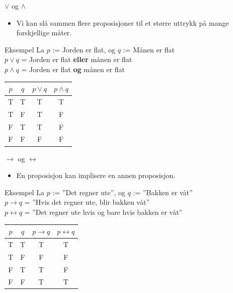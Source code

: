 \begin{frame}{$\lor$ og $\land$}
    \begin{itemize}
        \item Vi kan slå sammen flere proposisjoner til et større uttrykk på mange forskjellige måter.
    \end{itemize}
    \begin{block}{Eksempel}
        La $p$ := Jorden er flat, og $q$ := Månen er flat\\
        $p \lor q$ = Jorden er flat \textbf{eller} månen er flat\\
        $p \land q$ = Jorden er flat \textbf{og} månen er flat\\
    \end{block}
    \pause
    \begin{tabular}{c|c|c|c}
        $p$ & $q$ & $p \lor q$ & $p \land q$ \\ \hline
        T & T & T & T \\
        T & F & T & F \\
        F & T & T & F \\
        F & F & F & F \\
    \end{tabular}
\end{frame}

\begin{frame}{$\rightarrow$ og $\leftrightarrow$}
    \begin{itemize}
        \item En proposisjon kan implisere en annen proposisjon.
    \end{itemize}
    \begin{block}{Eksempel}
        La $p$ := ''Det regner ute'', og $q$ := ''Bakken er våt''\\
        $p \rightarrow q$ = ''Hvis det regner ute, blir bakken våt''\\
        $p \leftrightarrow q$ = ''Det regner ute hvis og bare hvis bakken er våt''
    \end{block}
    \pause
    \begin{tabular}{c|c|c|c}
        $p$ & $q$ & $p \rightarrow q$ & $p \leftrightarrow q$ \\ \hline
        T & T & T & T \\
        T & F & F & F \\
        F & T & T & F \\
        F & F & T & T \\
    \end{tabular}
\end{frame}

